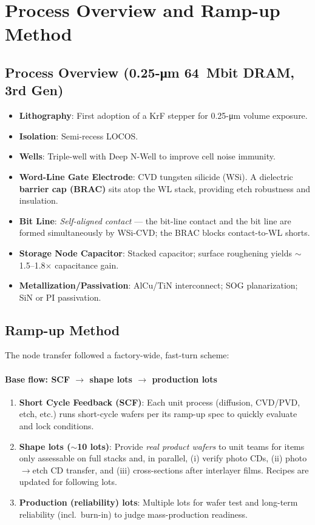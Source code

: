 \section{Process Overview and Ramp-up Method}

\subsection{Process Overview (0.25-\si{\micro\meter} 64~Mbit DRAM, 3rd Gen)}

\begin{itemize}
  \item \textbf{Lithography}: First adoption of a KrF stepper for 0.25-\si{\micro\meter} volume exposure.
  \item \textbf{Isolation}: Semi-recess LOCOS.
  \item \textbf{Wells}: Triple-well with Deep N-Well to improve cell noise immunity.
  \item \textbf{Word-Line Gate Electrode}: CVD tungsten silicide (WSi). A dielectric \textbf{barrier cap (BRAC)} sits atop the WL stack, providing etch robustness and insulation.
  \item \textbf{Bit Line}: \emph{Self-aligned contact} --- the bit-line contact and the bit line are formed simultaneously by WSi-CVD; the BRAC blocks contact-to-WL shorts.
  \item \textbf{Storage Node Capacitor}: Stacked capacitor; surface roughening yields $\sim$1.5–1.8$\times$ capacitance gain.
  \item \textbf{Metallization/Passivation}: AlCu/TiN interconnect; SOG planarization; SiN or PI passivation.
\end{itemize}

\subsection{Ramp-up Method}

The node transfer followed a factory-wide, fast-turn scheme:

\paragraph{Base flow: SCF $\rightarrow$ shape lots $\rightarrow$ production lots}
\begin{enumerate}
  \item \textbf{Short Cycle Feedback (SCF)}: Each unit process (diffusion, CVD/PVD, etch, etc.) runs short-cycle wafers per its ramp-up spec to quickly evaluate and lock conditions.
  \item \textbf{Shape lots ($\sim$10 lots)}: Provide \emph{real product wafers} to unit teams for items only assessable on full stacks and, in parallel, (i) verify photo CDs, (ii) photo$\to$etch CD transfer, and (iii) cross-sections after interlayer films. Recipes are updated for following lots.
  \item \textbf{Production (reliability) lots}: Multiple lots for wafer test and long-term reliability (incl.\ burn-in) to judge mass-production readiness.
\end{enumerate}

